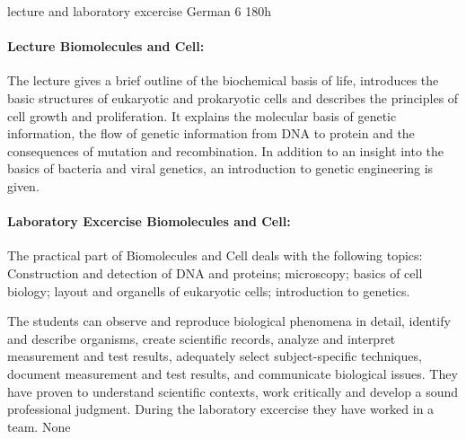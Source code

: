 {lecture and laboratory excercise}
{German}
{6}
{180h}
{\paragraph{Lecture Biomolecules and Cell:} The lecture gives a brief outline of the biochemical basis of life, introduces the basic structures of eukaryotic and prokaryotic cells and describes the principles of cell growth and proliferation. It explains the molecular basis of genetic information, the flow of genetic information from DNA to protein and the consequences of mutation and recombination. In addition to an insight into the basics of bacteria and viral genetics, an introduction to genetic engineering is given.
\paragraph{Laboratory Excercise Biomolecules and Cell:} The practical part of Biomolecules and Cell deals with the following topics:
Construction and detection of DNA and proteins;
microscopy; basics of cell biology; layout and organells of eukaryotic cells; introduction to genetics.}
{The students can observe and reproduce biological phenomena in detail, identify and describe organisms, create scientific records, analyze and interpret measurement and test results, adequately select subject-specific techniques, document measurement and test results, and communicate biological issues. They have proven to understand scientific contexts, work critically and develop a sound professional judgment. During the laboratory excercise they have worked in a team.}
{None}